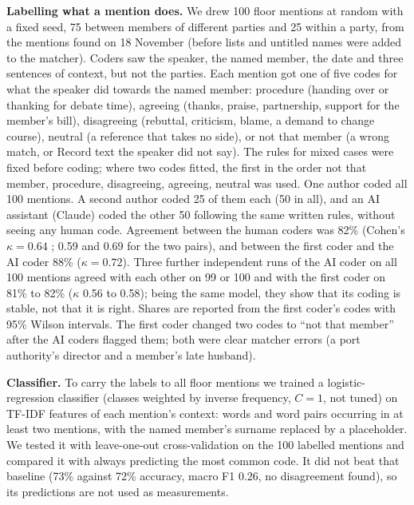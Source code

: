 


\textbf{Labelling what a mention does.} We drew 100 floor mentions at random with a fixed seed, 75 between members
of different parties and 25 within a party, from the mentions found on 18 November (before lists and untitled
names were added to the matcher). Coders saw the speaker, the named member, the date and three sentences of
context, but not the parties. Each mention got one of five codes for what the speaker did towards the named member:
procedure (handing over or thanking for debate time), agreeing (thanks, praise, partnership, support for the
member's bill), disagreeing (rebuttal, criticism, blame, a demand to change course), neutral (a reference that takes
no side), or not that member (a wrong match, or Record text the speaker did not say). The rules for mixed cases were
fixed before coding; where two codes fitted, the first in the order not that member, procedure, disagreeing,
agreeing, neutral was used. One author coded all 100 mentions. A second author coded 25 of them each (50 in all),
and an AI assistant (Claude) coded the other 50 following the same written rules, without seeing any human code.
Agreement between the human coders was 82\% (Cohen's $\kappa = 0.64$ \cite{cohen1960}; 0.59 and 0.69 for the two pairs), and between
the first coder and the AI coder 88\% ($\kappa = 0.72$). Three further independent runs of the AI coder on all 100
mentions agreed with each other on 99 or 100 and with the first coder on 81\% to 82\% ($\kappa$ 0.56 to 0.58); being
the same model, they show that its coding is stable, not that it is right. Shares are reported from the first
coder's codes with 95\% Wilson intervals. The first coder changed two codes to ``not that member'' after the AI
coders flagged them; both were clear matcher errors (a port authority's director and a member's late husband).

\textbf{Classifier.} To carry the labels to all floor mentions we trained a logistic-regression classifier (classes
weighted by inverse frequency, $C = 1$, not tuned) on TF-IDF features of each mention's context: words and word
pairs occurring in at least two mentions, with the named member's surname replaced by a placeholder. We tested it
with leave-one-out cross-validation on the 100 labelled mentions and compared it with always predicting the most
common code. It did not beat that baseline (73\% against 72\% accuracy, macro F1 0.26, no disagreement found), so
its predictions are not used as measurements.

